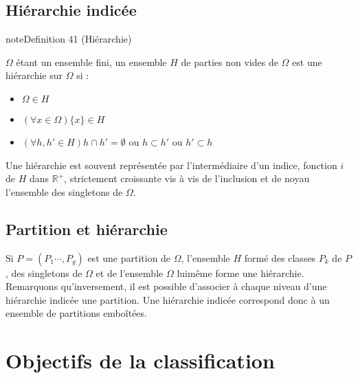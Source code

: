 \documentclass[letterpaper,10pt,english]{jupyterBook}
\begin{document}
\subsection{Hiérarchie indicée}
\label{\detokenize{clustering:hierarchie-indicee}}
\ignorespaces \label{clustering:definition-1}
\begin{sphinxadmonition}{note}{Definition 41 (Hiérarchie)}



\sphinxAtStartPar
\(\Omega\) étant un ensemble fini, un ensemble \(H\) de parties non vides de \(\Omega\) est une hiérarchie sur \(\Omega\) si :
\begin{itemize}
\item {} 
\sphinxAtStartPar
\(\Omega \in H\)

\item {} 
\sphinxAtStartPar
\((\forall x\in \Omega) \{x\}\in H\)

\item {} 
\sphinxAtStartPar
\((\forall h,h'\in H) h\cap h'=\emptyset\) ou \(h\subset h'\) ou \(h'\subset h\)

\end{itemize}
\end{sphinxadmonition}

\sphinxAtStartPar
Une hiérarchie est souvent représentée par l’intermédiaire d’un indice, fonction \(i\) de \(H\) dans \(\mathbb{R}^+\), strictement croissante vis à vis de l’inclusion et de noyau l’ensemble des singletons de \(\Omega\).


\subsection{Partition et hiérarchie}
\label{\detokenize{clustering:partition-et-hierarchie}}
\sphinxAtStartPar
Si \(P =(P_1 \cdots,P_g)\) est une partition de \(\Omega\), l’ensemble \(H\) formé des classes \(P_k\) de \(P\), des singletons de   \(\Omega\) et de l’ensemble  \(\Omega\) lui\sphinxhyphen{}même forme une hiérarchie. Remarquons qu’inversement, il est possible d’associer à chaque niveau d’une hiérarchie indicée une partition. Une hiérarchie indicée correspond donc à un ensemble de partitions emboîtées.


\section{Objectifs de la classification}
\label{\detokenize{clustering:objectifs-de-la-classification}}
\end{document}
